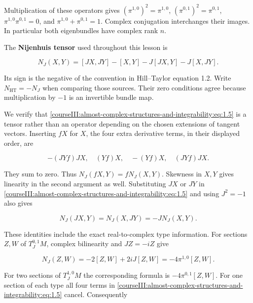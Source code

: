 Multiplication of these operators gives \((\pi^{1,0})^2=\pi^{1,0}\), \((\pi^{0,1})^2=\pi^{0,1}\), \(\pi^{1,0}\pi^{0,1}=0\), and \(\pi^{1,0}+\pi^{0,1}=1\). Complex conjugation interchanges their images. In particular both eigenbundles have complex rank \(n\).

The \textbf{Nijenhuis tensor} used throughout this lesson is

\begin{equation}
N_J(X,Y)=[JX,JY]-[X,Y]-J[JX,Y]-J[X,JY].
\label{courseIII:almost-complex-structures-and-integrability:eq:1.5}
\end{equation}

Its sign is the negative of the convention in Hill--Taylor equation 1.2. Write \(N_{\mathrm{HT}}=-N_J\) when comparing those sources. Their zero conditions agree because multiplication by \(-1\) is an invertible bundle map.

We verify that \eqref{courseIII:almost-complex-structures-and-integrability:eq:1.5} is a tensor rather than an operator depending on the chosen extensions of tangent vectors. Inserting \(fX\) for \(X\), the four extra derivative terms, in their displayed order, are

\begin{equation}
-(JYf)JX,\quad (Yf)X,\quad -(Yf)X,\quad (JYf)JX.
\label{courseIII:almost-complex-structures-and-integrability:eq:1.6}
\end{equation}

They sum to zero. Thus \(N_J(fX,Y)=fN_J(X,Y)\). Skewness in \(X,Y\) gives linearity in the second argument as well. Substituting \(JX\) or \(JY\) in \eqref{courseIII:almost-complex-structures-and-integrability:eq:1.5} and using \(J^2=-1\) also gives

\begin{equation}
N_J(JX,Y)=N_J(X,JY)=-J N_J(X,Y).
\label{courseIII:almost-complex-structures-and-integrability:eq:1.7}
\end{equation}

These identities include the exact real-to-complex type information. For sections \(Z,W\) of \(T^{0,1}_JM\), complex bilinearity and \(JZ=-iZ\) give

\begin{equation}
N_J(Z,W)=-2[Z,W]+2iJ[Z,W]
=-4\pi^{1,0}[Z,W].
\label{courseIII:almost-complex-structures-and-integrability:eq:1.8}
\end{equation}

For two sections of \(T^{1,0}_JM\) the corresponding formula is \(-4\pi^{0,1}[Z,W]\). For one section of each type all four terms in \eqref{courseIII:almost-complex-structures-and-integrability:eq:1.5} cancel. Consequently

